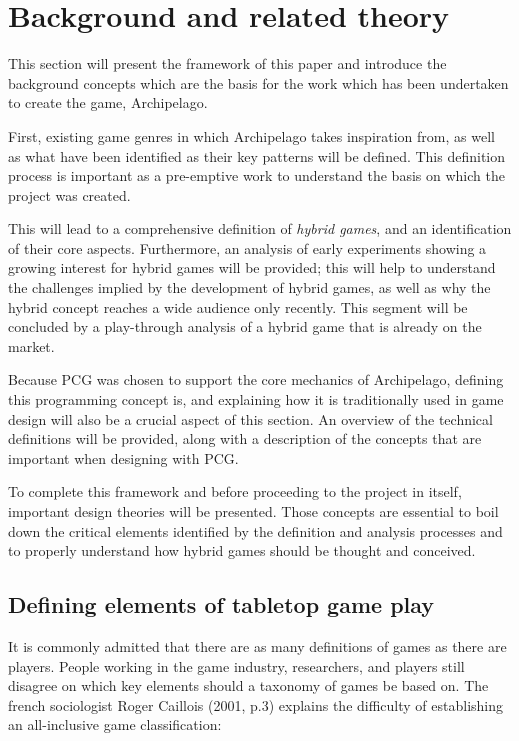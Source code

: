 \chapter{Background and related theory}
This section will present the framework of this paper and introduce the background concepts which are the basis for the work which has been undertaken to create the game, Archipelago. 

First, existing game genres in which Archipelago takes inspiration from, as well as what have been identified as their key patterns will be defined. This definition process is important as a pre-emptive work to understand the basis on which the project was created. 

This will lead to a comprehensive definition of \textit{hybrid games}, and an identification of their core aspects. Furthermore, an analysis of early experiments showing a growing interest for hybrid games will be provided; this will help to understand the challenges implied by the development of hybrid games, as well as why the hybrid concept reaches a wide audience only recently. This segment will be concluded by a play-through analysis of a hybrid game that is already on the market.

Because PCG was chosen to support the core mechanics of Archipelago, defining this programming concept is, and explaining how it is traditionally used in game design will also be a crucial aspect of this section. An overview of the technical definitions will be provided, along with a description of the concepts that are important when designing with PCG. 

To complete this framework and before proceeding to the project in itself, important design theories will be presented. Those concepts are essential to boil down the critical elements identified by the definition and analysis processes and to properly understand how hybrid games should be thought and conceived.

\section{Defining elements of tabletop game play}
It is commonly admitted that there are as many definitions of games as there are players. People working in the game industry, researchers, and players still disagree on which key elements should a taxonomy of games be based on. The french sociologist Roger Caillois (2001, p.3) \cite{book:mpg} explains the difficulty of establishing an all-inclusive game classification:

